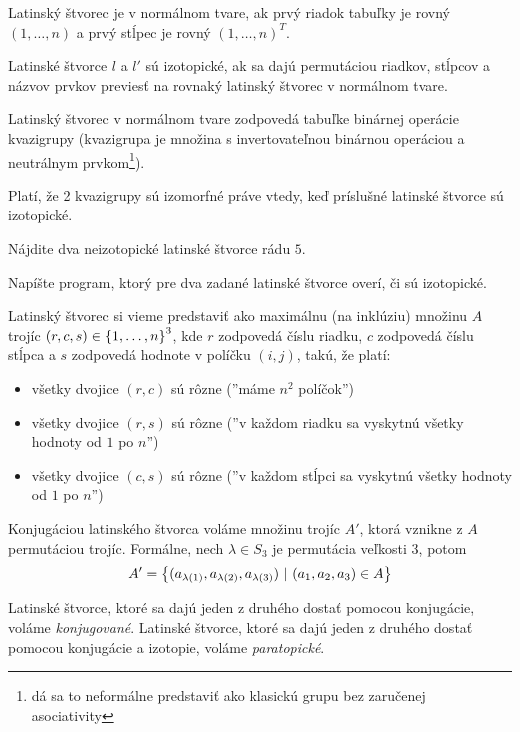 \begin{definition}
Latinský štvorec je v normálnom tvare, ak prvý riadok tabuľky je rovný $(1, \ldots, n)$ a prvý stĺpec je rovný $(1, \ldots, n)^T$.
\end{definition}

\begin{definition}
Latinské štvorce $l$ a $l'$ sú izotopické, ak sa dajú permutáciou riadkov, stĺpcov a názvov prvkov previesť na rovnaký latinský štvorec v normálnom tvare.
\end{definition}

\begin{remark}
Latinský štvorec v normálnom tvare zodpovedá tabuľke binárnej operácie kvazigrupy 
(kvazigrupa je množina s invertovateľnou binárnou operáciou a neutrálnym prvkom\footnote{dá sa to neformálne predstaviť ako klasickú grupu bez zaručenej asociativity}).

Platí, že 2 kvazigrupy sú izomorfné práve vtedy, keď príslušné latinské štvorce sú izotopické.
\end{remark}


\begin{exercise}
Nájdite dva neizotopické latinské štvorce rádu $5$.
\end{exercise}


\begin{exercise}
Napíšte program, ktorý pre dva zadané latinské štvorce overí, či sú izotopické.
\end{exercise}



\begin{definition}
Latinský štvorec si vieme predstaviť ako maximálnu (na inklúziu) množinu $A$ trojíc $(r,c,s) \in \left\{1, \ldots, n\right\}^3$, 
kde $r$ zodpovedá číslu riadku, $c$ zodpovedá číslu stĺpca a $s$ zodpovedá hodnote v políčku $(i, j)$, 
takú, že platí:
\begin{itemize}
    \item všetky dvojice $(r, c)$ sú rôzne (''máme $n^2$ políčok'')
    \item všetky dvojice $(r, s)$ sú rôzne (''v každom riadku sa vyskytnú všetky hodnoty od $1$ po $n$'')
    \item všetky dvojice $(c, s)$ sú rôzne (''v každom stĺpci sa vyskytnú všetky hodnoty od $1$ po $n$'')
\end{itemize}  

Konjugáciou latinského štvorca voláme množinu trojíc $A'$, ktorá vznikne z $A$ permutáciou trojíc. Formálne,
nech $\lambda \in S_3$ je permutácia veľkosti $3$, potom $$A' = \left\{ (a_{\lambda(1)}, a_{\lambda(2)}, a_{\lambda(3)} ) ~|~ (a_1, a_2, a_3) \in A\right\}$$

Latinské štvorce, ktoré sa dajú jeden z druhého dostať pomocou konjugácie, voláme \emph{konjugované}.
Latinské štvorce, ktoré sa dajú jeden z druhého dostať pomocou konjugácie a izotopie, voláme \emph{paratopické}.

\end{definition}



